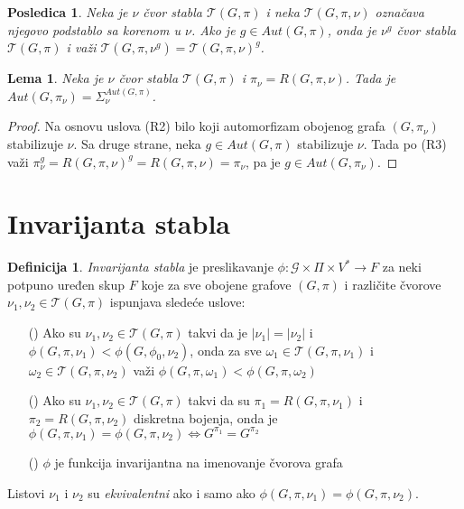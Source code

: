 \documentclass[12pt,oneside]{memoir}
\newtheorem{lemma}{Lema}
\newtheorem{corrolary}{Posledica}
\theoremstyle{definition}
\newtheorem*{definition}{Definicija}
\begin{document}
  \begin{corrolary}
      Neka je $\nu$ čvor stabla $\mathcal{T}(G, \pi)$ i neka $\mathcal{T}(G,
      \pi, \nu)$ označava njegovo podstablo sa korenom u $\nu$. Ako je $g
      \in Aut(G, \pi)$, onda je $\nu^g$ čvor stabla $\mathcal{T}(G, \pi)$ i
      važi $\mathcal{T}(G, \pi, \nu^g) = \mathcal{T}(G, \pi, \nu)^g$.
  \end{corrolary}

  \begin{lemma}
      Neka je $\nu$ čvor stabla $\mathcal{T}(G, \pi)$ i $\pi_\nu = R(G, \pi,
      \nu)$. Tada je $Aut(G, \pi_\nu) = \Sigma_\nu^{Aut(G, \pi)}$.
  \end{lemma}

  \begin{proof}
	  Na osnovu uslova (R2) bilo koji automorfizam obojenog grafa $(G,
	  \pi_\nu)$ stabilizuje $\nu$. Sa druge strane, neka $g \in Aut(G, \pi)$
	  stabilizuje $\nu$. Tada po (R3) važi $\pi_\nu^g = R(G, \pi, \nu)^g = R(G,
	  \pi, \nu) = \pi_\nu$, pa je $g \in Aut(G, \pi_\nu)$.
  \end{proof}

 \section{Invarijanta stabla}

  \begin{definition}
	  \emph{Invarijanta stabla} je preslikavanje $\phi : \mathcal{G} \times \Pi
	  \times V^* \to F$ za neki potpuno uređen skup $F$ koje za sve obojene
	  grafove $(G, \pi)$ i različite čvorove $\nu_1, \nu_2 \in \mathcal{T}(G,
	  \pi)$ ispunjava sledeće uslove:

	  \begin{itemize}
		  \item[(\phi1)] Ako su $\nu_1, \nu_2 \in \mathcal{T}(G, \pi)$ takvi
			  da je $|\nu_1|=|\nu_2|$ i $\phi(G, \pi, \nu_1) < \phi(G,
			  \phi_0, \nu_2)$, onda za sve $\omega_1 \in \mathcal{T}(G, \pi,
			  \nu_1)$ i $\omega_2 \in \mathcal{T}(G, \pi, \nu_2)$ važi
			  $\phi(G, \pi, \omega_1) < \phi(G, \pi, \omega_2)$
		  \item[(\phi2)] Ako su $\nu_1, \nu_2 \in \mathcal{T}(G, \pi)$ takvi
			  da su $\pi_1 = R(G, \pi, \nu_1)$ i $\pi_2 = R(G, \pi, \nu_2)$
			  diskretna bojenja, onda je $\phi(G, \pi, \nu_1) = \phi(G,
			  \pi, \nu_2) \iff G^{\pi_1} = G^{\pi_2}$
		  \item[(\phi3)] $\phi$ je funkcija invarijantna na imenovanje čvorova
			  grafa
	  \end{itemize}

	  Listovi $\nu_1$ i $\nu_2$ su \emph{ekvivalentni} ako i samo ako $\phi(G,
	  \pi, \nu_1) = \phi(G, \pi, \nu_2)$.
  \end{definition}
\end{document}

